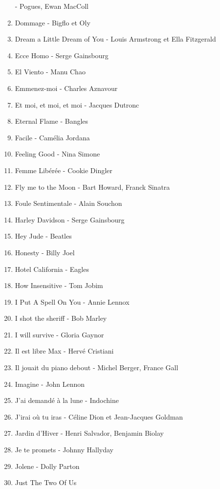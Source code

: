 \documentclass[12pt]{extarticle}
\begin{document}
\begin{multicols}{2}
\begin{enumerate}[nolistsep]
        - Pogues, Ewan MacColl
\item   Dommage
        - Bigflo et Oly
\item   Dream a Little Dream of You
        - Louis Armstrong et Ella Fitzgerald
\item   Ecce Homo
        - Serge Gainsbourg
\item   El Viento
        - Manu Chao
\item   Emmenez-moi
        - Charles Aznavour
\item   Et moi, et moi, et moi
        - Jacques Dutronc
\item   Eternal Flame
        - Bangles
\item   Facile
        - Camélia Jordana
\item   Feeling Good
        - Nina Simone
\item   Femme Libérée
        - Cookie Dingler
\item   Fly me to the Moon
        - Bart Howard, Franck Sinatra
\item   Foule Sentimentale
        - Alain Souchon
\item   Harley Davidson
        - Serge Gainsbourg
\item   Hey Jude
        - Beatles
\item   Honesty
        - Billy Joel
\item   Hotel California
        - Eagles
\item   How Insensitive
        - Tom Jobim
\item   I Put A Spell On You
        - Annie Lennox
\item   I shot the sheriff
        - Bob Marley
\item   I will survive
        - Gloria Gaynor
\item   Il est libre Max
        - Hervé Cristiani
\item   Il jouait du piano debout
        - Michel Berger, France Gall
\item   Imagine
        - John Lennon
\item   J'ai demandé à la lune
        - Indochine
\item   J'irai où tu iras
        - Céline Dion et Jean-Jacques Goldman
\item   Jardin d'Hiver
        - Henri Salvador, Benjamin Biolay
\item   Je te promets
        - Johnny Hallyday
\item   Jolene
        - Dolly Parton
\item   Just The Two Of Us

\end{enumerate}
\end{multicols}
\end{document}
